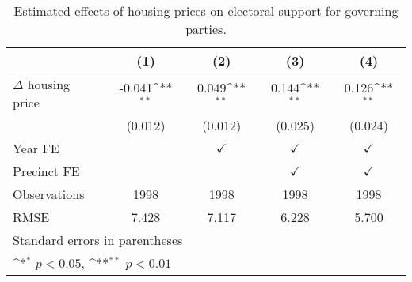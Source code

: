 \begin{table}[htbp]\centering
\def\sym#1{\ifmmode^{#1}\else\(^{#1}\)\fi}
\caption{Estimated effects of housing prices on electoral support for governing parties.} \label{predv}
\begin{tabular}{l*{4}{c}}
\hline\hline
                    &\multicolumn{1}{c}{(1)}        &\multicolumn{1}{c}{(2)}        &\multicolumn{1}{c}{(3)}        &\multicolumn{1}{c}{(4)}        \\
\hline
$\Delta$ housing price&      -0.041\sym{**}&       0.049\sym{**}&       0.144\sym{**}&       0.126\sym{**}\\
                    &     (0.012)        &     (0.012)        &     (0.025)        &     (0.024)        \\
[1em]
\hline Year FE      &                    &$\checkmark$        &$\checkmark$        &$\checkmark$        \\
[1em]
Precinct FE         &                    &                    &$\checkmark$        &$\checkmark$        \\
\hline
Observations        &        1998        &        1998        &        1998        &        1998        \\
RMSE                &       7.428        &       7.117        &       6.228        &       5.700        \\
\hline\hline
\multicolumn{5}{l}{\footnotesize Standard errors in parentheses}\\
\multicolumn{5}{l}{\footnotesize \sym{*} \(p<0.05\), \sym{**} \(p<0.01\)}\\
\end{tabular}
\end{table}
